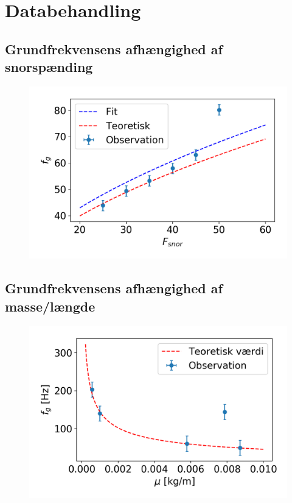 \section{Databehandling}
\subsection{Grundfrekvensens afhængighed af snorspænding}
\begin{figure}[H]
    \includegraphics[width=\linewidth]{frekvensSnorSpaending.png}
    \caption{}
    \label{fig:frekvensSNor}
\end{figure}
\subsection{Grundfrekvensens afhængighed af masse/længde}
\begin{figure}[H]
    \includegraphics[width=\linewidth]{frekvensMu.png}
    \caption{}
    \label{fig:frekvensMu}
\end{figure}
